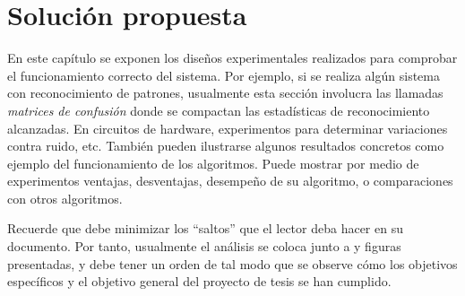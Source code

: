 \chapter{Solución propuesta}
\label{ch:especifico3}

En este capítulo se exponen los diseños experimentales realizados para
comprobar el funcionamiento correcto del sistema. Por ejemplo, si se
realiza algún sistema con reconocimiento de patrones, usualmente esta
sección involucra las llamadas \emph{matrices de confusión} donde se
compactan las estadísticas de reconocimiento alcanzadas. En circuitos
de hardware, experimentos para determinar variaciones contra ruido,
etc. También pueden ilustrarse algunos resultados concretos como
ejemplo del funcionamiento de los algoritmos. Puede mostrar por medio
de experimentos ventajas, desventajas, desempeño de su algoritmo, o
comparaciones con otros algoritmos.

Recuerde que debe minimizar los ``saltos'' que el lector deba hacer en
su documento. Por tanto, usualmente el análisis se coloca junto a
\tablas y figuras presentadas, y debe tener un orden de tal modo que se
observe cómo los objetivos específicos y el objetivo general del
proyecto de tesis se han cumplido.
